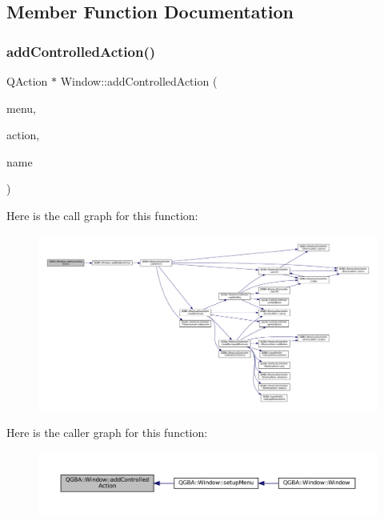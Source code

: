 \subsection{Member Function Documentation}
\mbox{\label{class_q_g_b_a_1_1_window_ac79df84a0768a432e4872f68a03e96e6}} 
\subsubsection{\texorpdfstring{add\+Controlled\+Action()}{addControlledAction()}}
{\footnotesize\ttfamily Q\+Action $\ast$ Window\+::add\+Controlled\+Action (\begin{DoxyParamCaption}\item[{Q\+Menu $\ast$}]{menu,  }\item[{Q\+Action $\ast$}]{action,  }\item[{const Q\+String \&}]{name }\end{DoxyParamCaption})\hspace{0.3cm}{\ttfamily [private]}}

Here is the call graph for this function\+:
\nopagebreak
\begin{figure}[H]
\begin{center}
\leavevmode
\includegraphics[width=350pt]{class_q_g_b_a_1_1_window_ac79df84a0768a432e4872f68a03e96e6_cgraph}
\end{center}
\end{figure}
Here is the caller graph for this function\+:
\nopagebreak
\begin{figure}[H]
\begin{center}
\leavevmode
\includegraphics[width=350pt]{class_q_g_b_a_1_1_window_ac79df84a0768a432e4872f68a03e96e6_icgraph}
\end{center}
\end{figure}
\mbox{\label{class_q_g_b_a_1_1_window_a3ab387305397be7854469d5060e678db}} 
